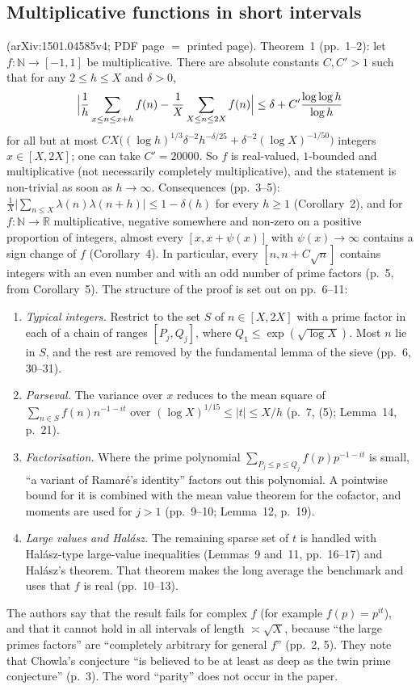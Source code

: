 \subsection{Multiplicative functions in short intervals}\label{subsec:mr16}
 \cite{MR16} (arXiv:1501.04585v4; PDF page $=$ printed page).
Theorem~1 (pp.~1--2): let $f:\mathbb N\to[-1,1]$ be multiplicative. There are
absolute constants $C,C'>1$ such that for any $2\le h\le X$ and $\delta>0$,
\[
\Bigl|\frac1h\sum_{x\le n\le x+h}f(n)-\frac1X\sum_{X\le n\le2X}f(n)\Bigr|
\le\delta+C'\frac{\log\log h}{\log h}
\]
for all but at most
$CX\bigl((\log h)^{1/3}\delta^{-2}h^{-\delta/25}+\delta^{-2}(\log X)^{-1/50}\bigr)$
integers $x\in[X,2X]$; one can take $C'=20000$. So $f$ is real-valued,
$1$-bounded and multiplicative (not necessarily completely multiplicative),
and the statement is non-trivial as soon as $h\to\infty$. Consequences (pp.~3--5):
$\frac1X\bigl|\sum_{n\le X}\lambda(n)\lambda(n+h)\bigr|\le1-\delta(h)$ for
every $h\ge1$ (Corollary~2), and for $f:\mathbb N\to\mathbb R$ multiplicative,
negative somewhere and non-zero on a positive proportion of integers, almost
every $[x,x+\psi(x)]$ with $\psi(x)\to\infty$ contains a sign change of $f$
(Corollary~4). In particular, every $[n,n+C\sqrt n]$ contains integers
with an even number and with an odd number of prime factors (p.~5, from
Corollary~5). The structure of the proof is set out on pp.~6--11:
\begin{enumerate}
\item \emph{Typical integers.} Restrict to the set $S$ of $n\in[X,2X]$
  with a prime factor in each of a chain of ranges $[P_j,Q_j]$, where
  $Q_1\le\exp(\sqrt{\log X})$. Most $n$ lie in $S$, and the rest are removed by
  the fundamental lemma of the sieve (pp.~6, 30--31).
\item \emph{Parseval.} The variance over $x$ reduces to the mean square
  of $\sum_{n\in S}f(n)n^{-1-it}$ over $(\log X)^{1/15}\le|t|\le X/h$
  (p.~7, (5); Lemma~14, p.~21).
\item \emph{Factorisation.} Where the prime polynomial
  $\sum_{P_j\le p\le Q_j}f(p)p^{-1-it}$ is small, ``a variant of Ramar\'e's
  identity'' factors out this polynomial. A pointwise bound for it is combined
  with the mean value theorem for the cofactor, and moments are used for $j>1$
  (pp.~9--10; Lemma~12, p.~19).
\item \emph{Large values and Hal\'asz.} The remaining sparse set of $t$ is
  handled with Hal\'asz-type large-value inequalities (Lemmas~9 and~11,
  pp.~16--17) and Hal\'asz's theorem. That theorem makes the long average the
  benchmark and uses that $f$ is real (pp.~10--13).
\end{enumerate}
The authors say that the result fails for complex $f$ (for example
$f(p)=p^{it}$), and that it cannot hold in all intervals of length
$\asymp\sqrt X$, because ``the large primes factors'' are ``completely arbitrary
for general $f$'' (pp.~2, 5). They note that Chowla's conjecture ``is believed
to be at least as deep as the twin prime conjecture'' (p.~3). The word
``parity'' does not occur in the paper.

